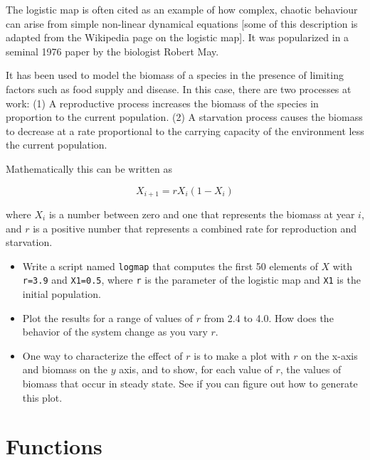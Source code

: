 \documentclass[
]{book}
\begin{document}
\begin{ex}
The logistic map is often cited as an example of how complex, chaotic
behaviour can arise from simple non-linear dynamical equations [some
of this description is adapted from the Wikipedia page on the logistic
map]. It was popularized in a seminal 1976 paper by the biologist
Robert May.

It has been used to model the biomass of a
species in the presence of limiting factors such as food supply and
disease.  In this case, there are two processes at work:
(1) A reproductive process increases the biomass of the species
in proportion to the current population.
(2) A starvation process causes the biomass to decrease at a rate
proportional to the carrying capacity of the environment less the
current population.

Mathematically this can be written as

\begin{equation}
X_{i+1} = r X_i (1-X_i)
\end{equation}

where $X_i$ is a number between zero and one that represents the
biomass at year $i$, and $r$ is a positive number that represents a
combined rate for reproduction and starvation.

\begin{itemize}

\item Write a script named {\tt logmap} that computes the first 50
elements of $X$ with {\tt r=3.9} and {\tt X1=0.5}, where
{\tt r} is the parameter of the logistic map and {\tt X1} is the
initial population.

\item Plot the results for a range of values of $r$ from 2.4 to 4.0.
How does the behavior of the system change as you vary $r$.

\item One way to characterize the effect of $r$ is to make a plot
with $r$ on the x-axis and biomass on the $y$ axis, and to show,
for each value of $r$, the values of biomass that occur in steady
state.  See if you can figure out how to generate this plot.

\end{itemize}

\end{ex}


\chapter{Functions}
\end{document}
